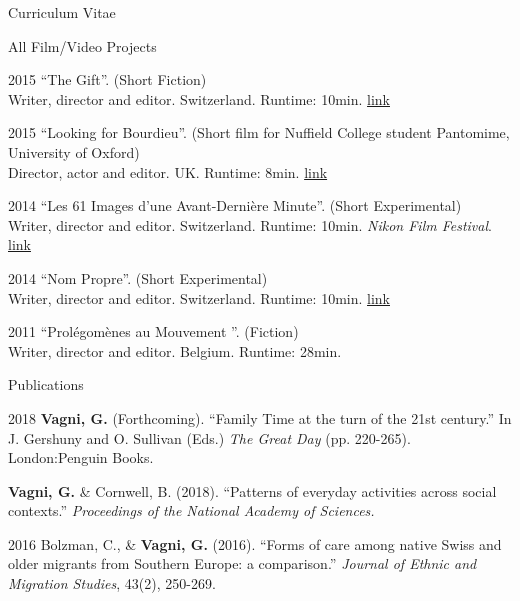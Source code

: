 \documentclass[12pt,a4paper]{article}
\begin{document}
\begin{cv}{Curriculum Vitae}
\begin{cvlist}{All Film/Video Projects}
     	\item[2015] ``The Gift''. (Short Fiction)
     	\\ Writer, director and editor. Switzerland. Runtime: 10min. 
      \href{https://accountablepictures.tumblr.com/post/163636586925} {link}
     	
     	\item[2015] ``Looking for Bourdieu''. (Short film for Nuffield College student Pantomime, University of Oxford)
     	 \\ Director, actor and editor. UK. Runtime: 8min. 
       \href{https://www.youtube.com/watch?v=i-aHf-_BgKc} {link}
 	     	
     	\item[2014] ``Les 61 Images d'une Avant-Derni\`ere Minute''. (Short Experimental)
     	\\ Writer, director and editor. Switzerland. Runtime: 10min. \emph{Nikon Film Festival}.
     	\href{https://accountablepictures.tumblr.com/post/163635947580/cinema-experimentalfilm-po%C3%A9sie-poetry} {link}

     	\item[2014] ``Nom Propre''. (Short Experimental)
     	\\ Writer, director and editor. Switzerland. Runtime: 10min. 
     	\href{https://accountablepictures.tumblr.com/post/163636007185} {link}
      
     	\item[2011] ``Prol\'egom\`enes au Mouvement	''. (Fiction)
     	\\ Writer, director and editor. Belgium. Runtime: 28min. 
     	
     \end{cvlist}
    
 
   \begin{cvlist}{Publications}
	\footnotesize
	
		\item [2018] \textbf{Vagni, G.}  (Forthcoming). ``Family Time at the turn of the 21st century.'' In J. Gershuny and O. Sullivan (Eds.) \emph{The Great Day} (pp. 220-265). London:Penguin Books.  
		
		\item [] \textbf{Vagni, G.} \& Cornwell, B. (2018). ``Patterns of everyday activities across social contexts.'' \emph{Proceedings of the National Academy of Sciences.} 
  	
   	\item [2016] Bolzman, C., \& \textbf{Vagni, G.}  (2016). ``Forms of care among native Swiss and older migrants from Southern Europe: a comparison.'' \emph{Journal of Ethnic and Migration Studies}, 43(2), 250-269.

   \end{cvlist}
 
  \date{~December~2018}
    
\end{cv}
\end{document}
